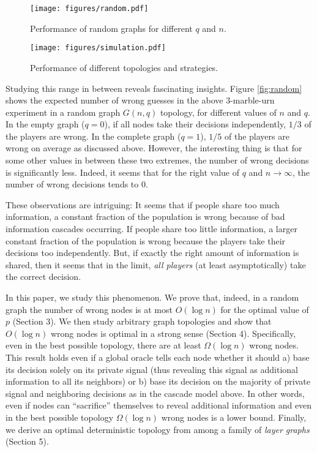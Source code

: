 \documentclass[a4paper,UKenglish]{lipics}
\theoremstyle{definition}
\begin{document}
\begin{figure}
	\begin{minipage}{2in}
    		\texttt{[image: figures/random.pdf]}
		\caption{Performance of random graphs for different $q$ and $n$.}
		\label{fig:random}
	\end{minipage}
	\hspace{1in}
	\begin{minipage}{2in}
		\texttt{[image: figures/simulation.pdf]}
		\caption{Performance of different topologies and strategies.}
		\label{fig:simulation}
	\end{minipage}
\end{figure}

Studying this range in between reveals fascinating insights. 
Figure \ref{fig:random} shows the expected number of wrong guesses 
	in the above 3-marble-urn experiment in a random graph $G(n,q)$ topology, 
	for different values of $n$ and $q$. 
In the empty graph ($q=0$), if all nodes take their decisions independently, $1/3$ of the players are wrong. 
In the complete graph ($q=1$), $1/5$ of the players are wrong on average as discussed above. 
However, the interesting thing is that for some other values in between these two extremes,
	the number of wrong decisions is significantly less. 
Indeed, it seems that for the right value of $q$ and $n\rightarrow\infty$, the number of wrong decisions tends to $0$. 

These observations are intriguing: 
	It seems that if people share too much information, 
	a constant fraction of the population is wrong because of bad information cascades occurring. 
If people share too little information, 
	a larger constant fraction of the population is wrong because the players take their decisions too independently. 
But, if exactly the right amount of information is shared, 
	then it seems that in the limit, \emph{all players} (at least asymptotically) take the correct decision. 

In this paper, we study this phenomenon. 
We prove that, indeed, in a random graph the number of wrong nodes is at most $O(\log n)$ for the optimal value of $p$ (Section 3). 
We then study arbitrary graph topologies and show that $O(\log n)$ wrong nodes is optimal in a strong sense (Section 4). 
Specifically, even in the best possible topology, there are at least $\Omega(\log n)$ wrong nodes. 
This result holds even if a global oracle tells each node whether it should 
	a) base its decision solely on its private signal (thus revealing this signal as additional information to all its neighbors) or 
	b) base its decision on the majority of private signal and neighboring decisions as in the cascade model above. 
In other words, even if nodes can ``sacrifice'' themselves to reveal additional information 
	and even in the best possible topology $\Omega(\log n)$ wrong nodes is a lower bound. 
Finally, we derive an optimal deterministic topology from among a family of \emph{layer graphs} (Section 5).
\end{document}
